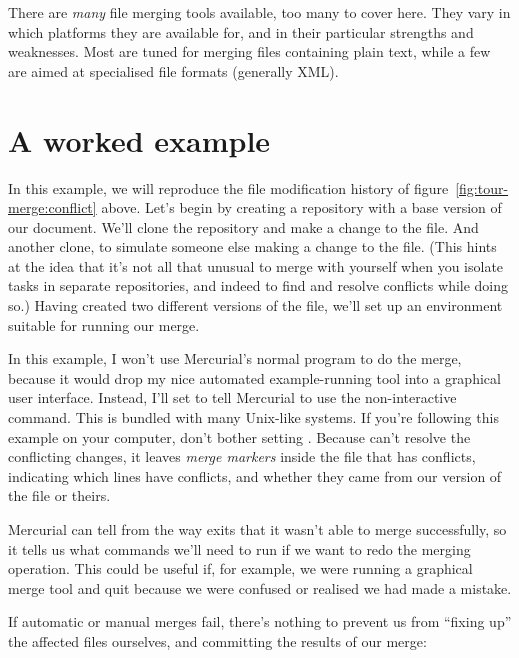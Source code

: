 There are \emph{many} file merging tools available, too many to cover
here.  They vary in which platforms they are available for, and in
their particular strengths and weaknesses.  Most are tuned for merging
files containing plain text, while a few are aimed at specialised file
formats (generally XML).

\section{A worked example}

In this example, we will reproduce the file modification history of
figure~\ref{fig:tour-merge:conflict} above.  Let's begin by creating a
repository with a base version of our document.
We'll clone the repository and make a change to the file.
And another clone, to simulate someone else making a change to the
file.  (This hints at the idea that it's not all that unusual to merge
with yourself when you isolate tasks in separate repositories, and
indeed to find and resolve conflicts while doing so.)
Having created two different versions of the file, we'll set up an
environment suitable for running our merge.

In this example, I won't use Mercurial's normal 
program to do the merge, because it would drop my nice automated
example-running tool into a graphical user interface.  Instead, I'll
set  to tell Mercurial to use the non-interactive
 command.  This is bundled with many Unix-like systems.
If you're following this example on your computer, don't bother
setting .
Because  can't resolve the conflicting changes, it
leaves \emph{merge markers} inside the file that has conflicts,
indicating which lines have conflicts, and whether they came from our
version of the file or theirs.

Mercurial can tell from the way  exits that it wasn't
able to merge successfully, so it tells us what commands we'll need to
run if we want to redo the merging operation.  This could be useful
if, for example, we were running a graphical merge tool and quit
because we were confused or realised we had made a mistake.

If automatic or manual merges fail, there's nothing to prevent us from
``fixing up'' the affected files ourselves, and committing the results
of our merge:

